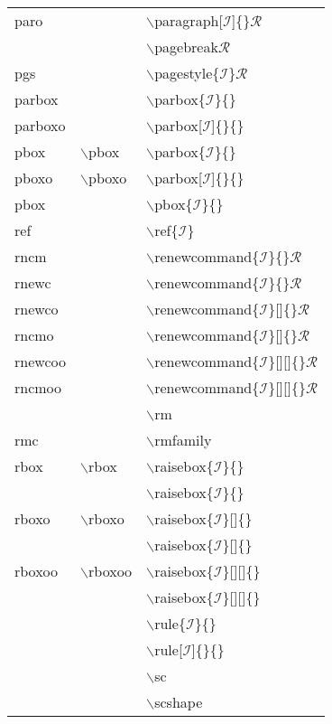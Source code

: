 \begin{longtable}{p{20mm}p{20mm}p{65mm}}
paro &  & $\backslash$paragraph[$\mathcal{I}$]\{\}$\mathcal{R}$\\
 &  & $\backslash$pagebreak$\mathcal{R}$\\
pgs &  & $\backslash$pagestyle\{$\mathcal{I}$\}$\mathcal{R}$\\
parbox &  & $\backslash$parbox\{$\mathcal{I}$\}\{\}\\
parboxo &  & $\backslash$parbox[$\mathcal{I}$]\{\}\{\}\\
pbox & $\backslash$pbox & $\backslash$parbox\{$\mathcal{I}$\}\{\}\\
pboxo & $\backslash$pboxo & $\backslash$parbox[$\mathcal{I}$]\{\}\{\}\\
pbox &  & $\backslash$pbox\{$\mathcal{I}$\}\{\}\\
ref &  & $\backslash$ref\{$\mathcal{I}$\}\\
rncm &  & $\backslash$renewcommand\{$\mathcal{I}$\}\{\}$\mathcal{R}$\\
rnewc &  & $\backslash$renewcommand\{$\mathcal{I}$\}\{\}$\mathcal{R}$\\
rnewco &  & $\backslash$renewcommand\{$\mathcal{I}$\}[]\{\}$\mathcal{R}$\\
rncmo &  & $\backslash$renewcommand\{$\mathcal{I}$\}[]\{\}$\mathcal{R}$\\
rnewcoo &  & $\backslash$renewcommand\{$\mathcal{I}$\}[][]\{\}$\mathcal{R}$\\
rncmoo &  & $\backslash$renewcommand\{$\mathcal{I}$\}[][]\{\}$\mathcal{R}$\\
 &  & $\backslash$rm\\
rmc &  & $\backslash$rmfamily\\
rbox & $\backslash$rbox & $\backslash$raisebox\{$\mathcal{I}$\}\{\}\\
 &  & $\backslash$raisebox\{$\mathcal{I}$\}\{\}\\
rboxo & $\backslash$rboxo & $\backslash$raisebox\{$\mathcal{I}$\}[]\{\}\\
 &  & $\backslash$raisebox\{$\mathcal{I}$\}[]\{\}\\
rboxoo & $\backslash$rboxoo & $\backslash$raisebox\{$\mathcal{I}$\}[][]\{\}\\
 &  & $\backslash$raisebox\{$\mathcal{I}$\}[][]\{\}\\
 &  & $\backslash$rule\{$\mathcal{I}$\}\{\}\\
 &  & $\backslash$rule[$\mathcal{I}$]\{\}\{\}\\
 &  & $\backslash$sc\\
 &  & $\backslash$scshape\\

\end{longtable}
